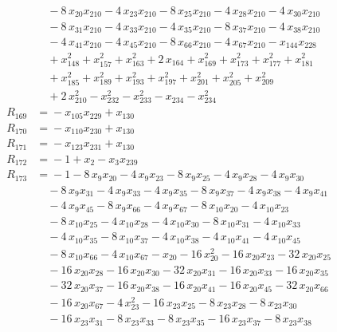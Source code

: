 \begin{align*}
&\quad{} -8\,x_{20} x_{210} -4\,x_{23} x_{210} -8\,x_{25} x_{210} -4\,x_{28} x_{210} -4\,x_{30} x_{210} \\
&\quad{} -8\,x_{31} x_{210} -4\,x_{33} x_{210} -4\,x_{35} x_{210} -8\,x_{37} x_{210} -4\,x_{38} x_{210} \\
&\quad{} -4\,x_{41} x_{210} -4\,x_{45} x_{210} -8\,x_{66} x_{210} -4\,x_{67} x_{210} -x_{144} x_{228} \\
&\quad{} +x_{148}^{2} +x_{157}^{2} +x_{163}^{2} +2\,x_{164} +x_{169}^{2} +x_{173}^{2} +x_{177}^{2} +x_{181}^{2} \\
&\quad{} +x_{185}^{2} +x_{189}^{2} +x_{193}^{2} +x_{197}^{2} +x_{201}^{2} +x_{205}^{2} +x_{209}^{2} \\
&\quad{} +2\,x_{210}^{2} -x_{232}^{2} -x_{233}^{2} -x_{234} -x_{234}^{2} \\[2pt]
R_{169} &={} -x_{105} x_{229} +x_{130} \\[2pt]
R_{170} &={} -x_{110} x_{230} +x_{130} \\[2pt]
R_{171} &={} -x_{123} x_{231} +x_{130} \\[2pt]
R_{172} &={} -1 +x_{2} -x_{3} x_{239} \\[2pt]
R_{173} &={} -1 -8\,x_{9} x_{20} -4\,x_{9} x_{23} -8\,x_{9} x_{25} -4\,x_{9} x_{28} -4\,x_{9} x_{30} \\
&\quad{} -8\,x_{9} x_{31} -4\,x_{9} x_{33} -4\,x_{9} x_{35} -8\,x_{9} x_{37} -4\,x_{9} x_{38} -4\,x_{9} x_{41} \\
&\quad{} -4\,x_{9} x_{45} -8\,x_{9} x_{66} -4\,x_{9} x_{67} -8\,x_{10} x_{20} -4\,x_{10} x_{23} \\
&\quad{} -8\,x_{10} x_{25} -4\,x_{10} x_{28} -4\,x_{10} x_{30} -8\,x_{10} x_{31} -4\,x_{10} x_{33} \\
&\quad{} -4\,x_{10} x_{35} -8\,x_{10} x_{37} -4\,x_{10} x_{38} -4\,x_{10} x_{41} -4\,x_{10} x_{45} \\
&\quad{} -8\,x_{10} x_{66} -4\,x_{10} x_{67} -x_{20} -16\,x_{20}^{2} -16\,x_{20} x_{23} -32\,x_{20} x_{25} \\
&\quad{} -16\,x_{20} x_{28} -16\,x_{20} x_{30} -32\,x_{20} x_{31} -16\,x_{20} x_{33} -16\,x_{20} x_{35} \\
&\quad{} -32\,x_{20} x_{37} -16\,x_{20} x_{38} -16\,x_{20} x_{41} -16\,x_{20} x_{45} -32\,x_{20} x_{66} \\
&\quad{} -16\,x_{20} x_{67} -4\,x_{23}^{2} -16\,x_{23} x_{25} -8\,x_{23} x_{28} -8\,x_{23} x_{30} \\
&\quad{} -16\,x_{23} x_{31} -8\,x_{23} x_{33} -8\,x_{23} x_{35} -16\,x_{23} x_{37} -8\,x_{23} x_{38} \\

\end{align*}
